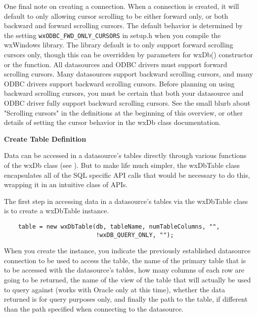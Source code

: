 One final note on creating a connection.  When a connection is created, it 
will default to only allowing cursor scrolling to be either forward only, 
or both backward and forward scrolling cursors.  The default behavior is 
determined by the setting {\tt wxODBC\_FWD\_ONLY\_CURSORS} in setup.h when you 
compile the wxWindows library.  The library default is to only support 
forward scrolling cursors only, though this can be overridden by parameters 
for wxDb() constructor or the  
function.  All datasources and ODBC drivers must support forward scrolling 
cursors.  Many datasources support backward scrolling cursors, and many 
ODBC drivers support backward scrolling cursors.  Before planning on using 
backward scrolling cursors, you must be certain that both your datasource 
and ODBC driver fully support backward scrolling cursors.  See the small 
blurb about "Scrolling cursors" in the definitions at the beginning of 
this overview, or other details of setting the cursor behavior in the wxDb 
class documentation.


{\bf Create Table Definition}

Data can be accessed in a datasource's tables directly through various 
functions of the wxDb class (see ).  But to make life much 
simpler, the wxDbTable class encapsulates all of the SQL specific API calls 
that would be necessary to do this, wrapping it in an intuitive class of APIs.

The first step in accessing data in a datasource's tables via the wxDbTable 
class is to create a wxDbTable instance.

\begin{verbatim}
    table = new wxDbTable(db, tableName, numTableColumns, "", 
                          !wxDB_QUERY_ONLY, "");
\end{verbatim}

When you create the instance, you indicate the previously established 
datasource connection to be used to access the table, the name of the 
primary table that is to be accessed with the datasource's tables, how many 
columns of each row are going to be returned, the name of the view of the 
table that will actually be used to query against (works with Oracle only 
at this time), whether the data returned is for query purposes only, and 
finally the path to the table, if different than the path specified when 
connecting to the datasource.

